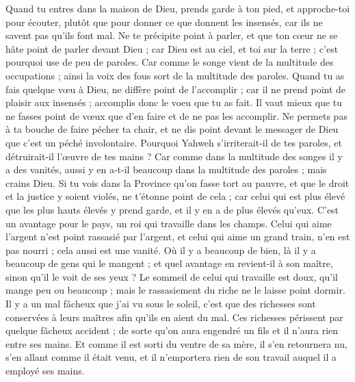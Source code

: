 \begin{multicols}{2}
Quand tu entres dans la maison de Dieu, prends garde à ton pied, et approche-toi pour écouter, plutôt que pour donner ce que donnent les insensés, car ils ne savent pas qu'ils font mal.
\VerseOne{}Ne te précipite point à parler, et que ton cœur ne se hâte point de parler devant Dieu ; car Dieu est au ciel, et toi sur la terre ; c'est pourquoi use de peu de paroles.
Car comme le songe vient de la multitude des occupations ; ainsi la voix des fous sort de la multitude des  paroles.
Quand tu as fais quelque vœu à Dieu, ne diffère point de l'accomplir ; car il ne prend point de plaisir aux insensés ; accomplis donc le voeu que tu as fait.
Il vaut mieux que tu ne fasses point de vœux que d'en faire et de ne pas les accomplir.
Ne permets pas à ta bouche de faire pécher ta chair, et ne dis point devant le messager de Dieu que c'est un péché involontaire. Pourquoi Yahweh s'irriterait-il de tes paroles, et détruirait-il l'œuvre de tes mains ?
Car comme dans la multitude des songes il y a des vanités, aussi y en a-t-il beaucoup dans la multitude des paroles ; mais crains Dieu.
Si tu vois dans la Province qu'on fasse tort au pauvre, et que le droit et la justice y soient violés, ne t'étonne point de cela ; car celui qui est plus élevé que les plus hauts élevés y prend garde, et il y en a de plus élevés qu’eux.
C'est un avantage pour le pays, un roi qui travaille dans les champs.
Celui qui aime l'argent n'est point rassasié par l'argent, et celui qui aime un grand train, n'en est pas nourri ; cela aussi est une vanité. 
Où il y a beaucoup de bien, là il y a beaucoup de gens qui le mangent ; et quel avantage en revient-il à son maître, sinon qu'il le voit de ses yeux ? 
Le sommeil de celui qui travaille est doux, qu'il mange peu ou beaucoup ; mais le rassasiement du riche ne le laisse point dormir. 
Il y a un mal fâcheux que j'ai vu sous le soleil, c'est que des richesses sont conservées à leurs maîtres afin qu'ils en aient du mal. 
Ces richesses périssent par quelque fâcheux accident ; de sorte qu'on aura engendré un fils et il n'aura rien entre ses mains.
Et comme il est sorti du ventre de sa mère, il s'en retournera nu, s'en allant comme il était venu, et il n'emportera rien de son travail auquel il a employé ses mains.

\end{multicols}
